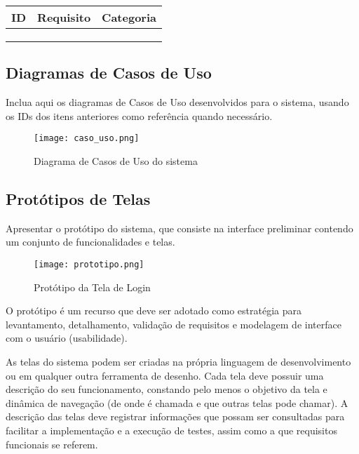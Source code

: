 \documentclass[a4paper,12pt]{article}
\begin{document}
\begin{longtable}{|c|p{10cm}|c|}
    \hline
    \textbf{ID} & \textbf{Requisito} & \textbf{Categoria} \\
    \hline
     &  &  \\
    \hline
     &  &  \\
    \hline
     &  &  \\
    \hline
\end{longtable}

\subsection{Diagramas de Casos de Uso}
Inclua aqui os diagramas de Casos de Uso desenvolvidos para o sistema, usando os IDs dos itens anteriores como referência quando necessário.

\begin{figure}[h]
    \centering
    \texttt{[image: caso\_uso.png]} %
    \caption{Diagrama de Casos de Uso do sistema}
    \label{fig:caso_uso}
\end{figure}

\clearpage

\subsection{Protótipos de Telas}
Apresentar o protótipo do sistema, que consiste na interface preliminar contendo um conjunto de funcionalidades e telas. 

\begin{figure}[h]
    \centering
    \texttt{[image: prototipo.png]}
    \caption{Protótipo da Tela de Login}
    \label{fig:prototipo_login}
\end{figure}

O protótipo é um recurso que deve ser adotado como estratégia para levantamento, detalhamento, validação de requisitos e modelagem de interface com o usuário (usabilidade).

As telas do sistema podem ser criadas na própria linguagem de desenvolvimento ou em qualquer outra ferramenta de desenho. Cada tela deve possuir uma descrição do seu funcionamento, constando pelo menos o objetivo da tela e dinâmica de navegação (de onde é chamada e que outras telas pode chamar). A descrição das telas deve registrar informações que possam ser consultadas para facilitar a implementação e a execução de testes, assim como a que requisitos funcionais se referem.
\end{document}
